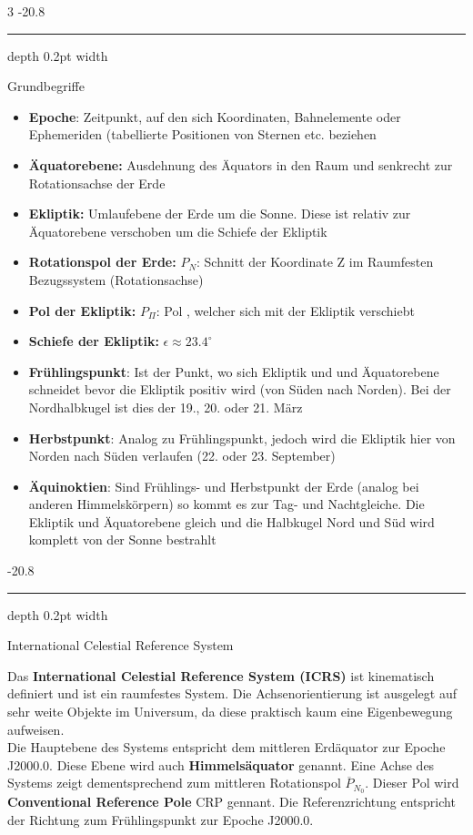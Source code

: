 \documentclass[9pt, landscape, fleqn]{scrartcl}
\makeatletter
\renewcommand{\subsubsection}{\@startsection{subsubsection}{1}{0mm}%
{-2\baselineskip}{0.8\baselineskip}%
{\hrule depth 0.2pt width\columnwidth\vspace*{1.2em}\normalsize\bfseries\rmfamily}}
\makeatother
\begin{document}
\begin{multicols*}{3}
\subsubsection{Grundbegriffe}
\begin{itemize}
    \item \textbf{Epoche}: Zeitpunkt, auf den sich Koordinaten, Bahnelemente oder Ephemeriden (tabellierte Positionen von Sternen etc. beziehen
    \item \textbf{Äquatorebene:} Ausdehnung des Äquators in den Raum und senkrecht zur Rotationsachse der Erde
    \item \textbf{Ekliptik:} Umlaufebene der Erde um die Sonne. Diese ist relativ zur Äquatorebene verschoben um die Schiefe der Ekliptik
    \item \textbf{Rotationspol der Erde:} $P_N$: Schnitt der Koordinate Z im Raumfesten Bezugssystem (Rotationsachse)
    \item \textbf{Pol der Ekliptik:} $P_\Pi$: Pol , welcher sich mit der Ekliptik verschiebt
    \item \textbf{Schiefe der Ekliptik:} $\epsilon \approx 23.4^{\circ}$
    \item \textbf{Frühlingspunkt}: Ist der Punkt, wo sich Ekliptik und und Äquatorebene schneidet bevor die Ekliptik positiv wird (von Süden nach Norden). Bei der Nordhalbkugel ist dies der 19., 20. oder 21. März
    \item \textbf{Herbstpunkt}: Analog zu Frühlingspunkt, jedoch wird die Ekliptik hier von Norden nach Süden verlaufen (22. oder 23. September)
    \item \textbf{Äquinoktien}: Sind Frühlings- und Herbstpunkt der Erde (analog bei anderen Himmelskörpern) so kommt es zur Tag- und Nachtgleiche. Die Ekliptik und Äquatorebene gleich und die Halbkugel Nord und Süd wird komplett von der Sonne bestrahlt
\end{itemize}

\subsubsection{International Celestial Reference System}

Das \textbf{International Celestial Reference System (ICRS)} ist kinematisch definiert und ist ein raumfestes System. Die Achsenorientierung ist ausgelegt auf sehr weite Objekte im Universum, da diese praktisch kaum eine Eigenbewegung aufweisen. \\

Die Hauptebene des Systems entspricht dem mittleren Erdäquator zur Epoche J2000.0. Diese Ebene wird auch \textbf{Himmelsäquator} genannt. Eine Achse des Systems zeigt dementsprechend zum mittleren Rotationspol $\overline{P}_{N_0}$. Dieser Pol wird \textbf{Conventional Reference Pole} CRP gennant.
Die Referenzrichtung entspricht der Richtung zum Frühlingspunkt zur Epoche J2000.0.\\


\end{multicols*}
\end{document}
